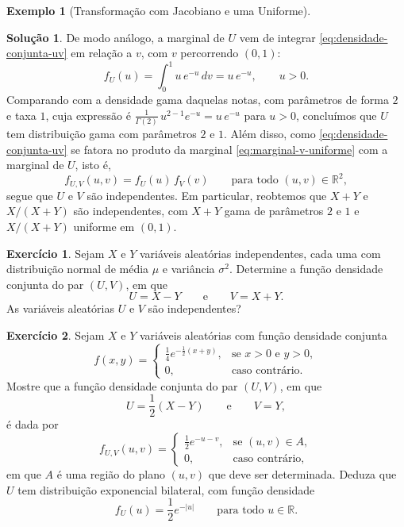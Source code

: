 \documentclass[12pt,portuguese]{article}
\theoremstyle{definition}
\newtheorem{example}[example]{Exemplo}
\theoremstyle{plainexercise}
\newtheorem{exercise}{Exercício}
\theoremstyle{starredexercise}
\theoremstyle{definition}
\newtheorem*{solution}{Solução}
\begin{document}
\begin{example}[Transformação com Jacobiano e uma Uniforme]
\begin{solution}
\medskip
De modo análogo, a marginal de $U$ vem de integrar
\eqref{eq:densidade-conjunta-uv} em relação a $v$, com $v$ percorrendo
$(0,1)$:
\[
f_U(u) = \int_0^1 u\,e^{-u}\,dv = u\,e^{-u}, \qquad u > 0.
\]
Comparando com a densidade gama daquelas notas, com parâmetros de forma
$2$ e taxa $1$, cuja expressão é
$\frac{1}{\Gamma(2)}\,u^{2-1}e^{-u} = u\,e^{-u}$ para $u > 0$,
concluímos que $U$ tem distribuição gama com parâmetros $2$ e $1$.
Além disso, como \eqref{eq:densidade-conjunta-uv} se fatora no produto
da marginal \eqref{eq:marginal-v-uniforme} com a marginal de $U$, isto é,
\[
f_{U,V}(u,v) = f_U(u)\,f_V(v) \qquad \text{para todo } (u,v) \in \mathbb{R}^2,
\]
segue que $U$ e $V$ são independentes. Em particular, reobtemos que
$X+Y$ e $X/(X+Y)$ são independentes, com $X+Y$ gama de parâmetros $2$ e
$1$ e $X/(X+Y)$ uniforme em $(0,1)$.
\end{solution}
\end{example}

\begin{exercise}\label{exercise:diferenca-soma-normais}
  Sejam $X$ e $Y$ variáveis aleatórias independentes, cada uma com
  distribuição normal de média $\mu$ e variância $\sigma^2$. Determine a
  função densidade conjunta do par $(U, V)$, em que
  \[
    U = X - Y
    \qquad \text{e} \qquad
    V = X + Y.
  \]
  As variáveis aleatórias $U$ e $V$ são independentes?
\end{exercise}

\begin{exercise}\label{exercise:distribuicao-dupla-exponencial}
  Sejam $X$ e $Y$ variáveis aleatórias com função densidade conjunta
  \[
    f(x, y) =
    \begin{cases}
      \frac{1}{4}e^{-\frac{1}{2}(x+y)}, & \text{se } x > 0 \text{ e } y > 0, \\[0.3cm]
      0, & \text{caso contrário}.
    \end{cases}
  \]
  Mostre que a função densidade conjunta do par $(U, V)$, em que
  \[
    U = \frac{1}{2}(X - Y)
    \qquad \text{e} \qquad
    V = Y,
  \]
  é dada por
  \[
    f_{U,V}(u, v) =
    \begin{cases}
      \frac{1}{2}e^{-u-v}, & \text{se } (u, v) \in A, \\[0.3cm]
      0, & \text{caso contrário},
    \end{cases}
  \]
  em que $A$ é uma região do plano $(u, v)$ que deve ser determinada.
  Deduza que $U$ tem distribuição exponencial bilateral, com função densidade
  \[
    f_U(u) = \frac{1}{2}e^{-|u|}
    \qquad \text{para todo } u \in \mathbb{R}.
  \]
\end{exercise}
\end{document}
